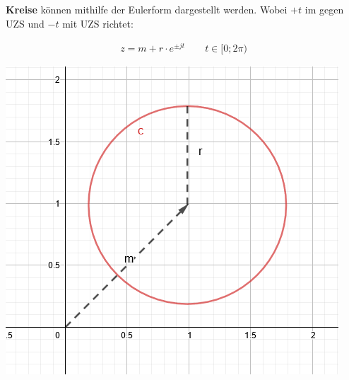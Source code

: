 \begin{minipage}{\columnwidth}	
	\noindent\textbf{Kreise} können mithilfe der Eulerform dargestellt werden. Wobei $+t$ im gegen UZS und $-t$ mit UZS richtet:
	
	\begin{minipage}{0.6\textwidth}
		\begin{align*}
			z = m + r \cdot e ^{\pm jt} \qquad t \in [0; 2\pi)
		\end{align*}
	\end{minipage}%
	\begin{minipage}{0.4\textwidth}
		\includegraphics[width=\columnwidth]{Images/parameter_kreis}
	\end{minipage}
\end{minipage}

